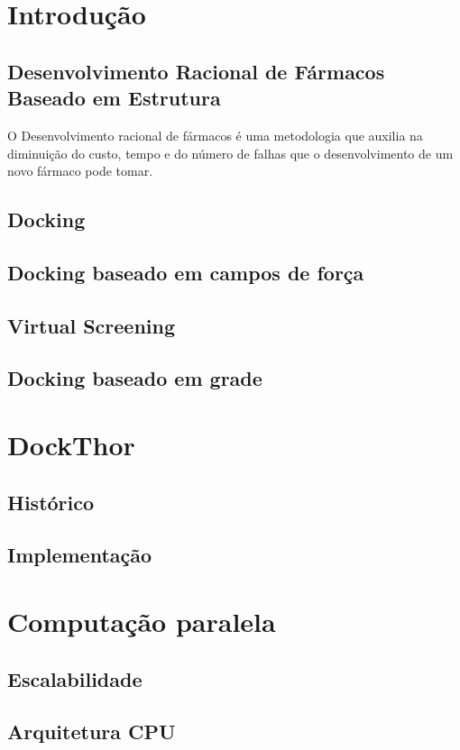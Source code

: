 \chapter[Introdução]{Introdução}\label{cap_intro}

\section{Desenvolvimento Racional de Fármacos Baseado em Estrutura}
O Desenvolvimento racional de fármacos é uma metodologia que auxilia na diminuição do custo, tempo e do número de falhas que o desenvolvimento de um novo fármaco pode tomar.

\section{Docking}
\section{Docking baseado em campos de força}
\section{Virtual Screening}
\section{Docking baseado em grade}

\chapter{DockThor}
\section{Histórico}
\section{Implementação}

\chapter{Computação paralela}
\section{Escalabilidade}
\section{Arquitetura CPU}
